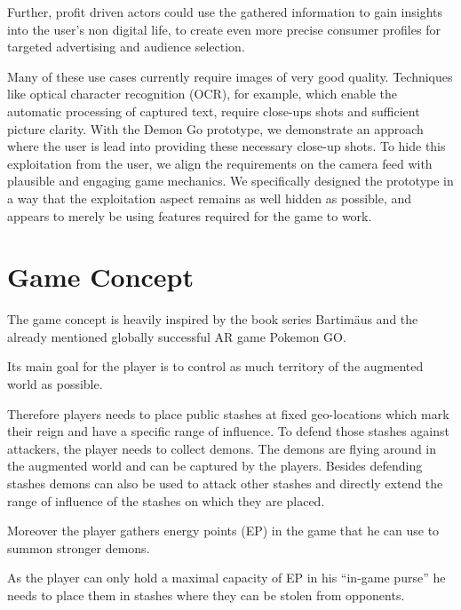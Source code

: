 Further, profit driven actors could use the gathered information to gain insights into the user's non digital life, to create even more precise consumer profiles for targeted advertising and audience selection.

Many of these use cases currently require images of very good quality.
Techniques like optical character recognition (OCR), for example, which enable the automatic processing of captured text, require close-ups shots and sufficient picture clarity.
With the Demon Go prototype, we demonstrate an approach where the user is lead into providing these necessary close-up shots.
To hide this exploitation from the user, we align the requirements on the camera feed with plausible and engaging game mechanics.
We specifically designed the prototype in a way that the exploitation aspect remains as well hidden as possible, and appears to merely be using features required for the game to work.

\section{Game Concept}
\label{sec:concept}


The game concept is heavily inspired by the book series Bartimäus and the already mentioned globally successful AR game Pokemon GO.

Its main goal for the player is to control as much territory of the augmented world as possible.

Therefore players needs to place public stashes at fixed geo-locations which mark their reign and have a specific range of influence. 
To defend those stashes against attackers, the player needs to collect demons. The demons are flying around in the augmented world and can be captured by the players. 
Besides defending stashes demons can also be used to attack other stashes and directly extend the range of influence of the stashes on which they are placed.

Moreover the player gathers energy points (EP) in the game that he can use to summon stronger demons.

As the player can only hold a maximal capacity of EP in his \enquote{in-game purse} he needs to place them in stashes where they can be stolen from opponents.

